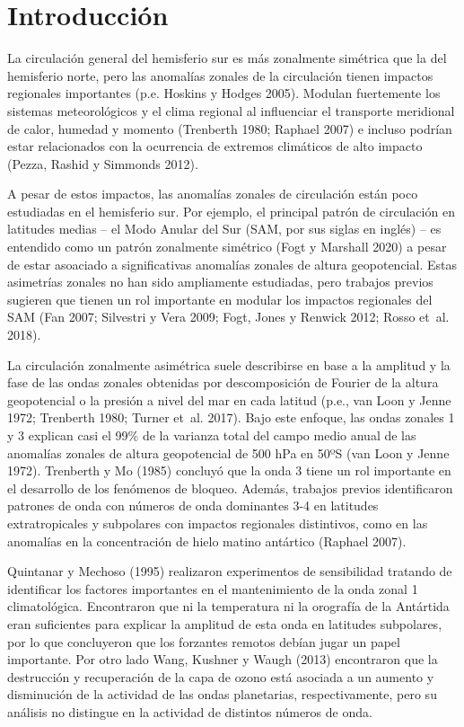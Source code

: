\documentclass[12pt,oneside,a4paper]{reedthesis}
\begin{document}
\hypertarget{intro}{%
\chapter{Introducción}\label{intro}}

La circulación general del hemisferio sur es más zonalmente simétrica que la del hemisferio norte, pero las anomalías zonales de la circulación tienen impactos regionales importantes (p.e. Hoskins y Hodges 2005).
Modulan fuertemente los sistemas meteorológicos y el clima regional al influenciar el transporte meridional de calor, humedad y momento (Trenberth 1980; Raphael 2007) e incluso podrían estar relacionados con la ocurrencia de extremos climáticos de alto impacto (Pezza, Rashid y Simmonds 2012).

A pesar de estos impactos, las anomalías zonales de circulación están poco estudiadas en el hemisferio sur.
Por ejemplo, el principal patrón de circulación en latitudes medias -- el Modo Anular del Sur (SAM, por sus siglas en inglés) -- es entendido como un patrón zonalmente simétrico (Fogt y Marshall 2020) a pesar de estar asoaciado a significativas anomalías zonales de altura geopotencial.
Estas asimetrías zonales no han sido ampliamente estudiadas, pero trabajos previos sugieren que tienen un rol importante en modular los impactos regionales del SAM (Fan 2007; Silvestri y Vera 2009; Fogt, Jones y Renwick 2012; Rosso et~al. 2018).

La circulación zonalmente asimétrica suele describirse en base a la amplitud y la fase de las ondas zonales obtenidas por descomposición de Fourier de la altura geopotencial o la presión a nivel del mar en cada latitud (p.e., van Loon y Jenne 1972; Trenberth 1980; Turner et~al. 2017).
Bajo este enfoque, las ondas zonales 1 y 3 explican casi el 99\% de la varianza total del campo medio anual de las anomalías zonales de altura geopotencial de 500 hPa en 50ºS (van Loon y Jenne 1972).
Trenberth y Mo (1985) concluyó que la onda 3 tiene un rol importante en el desarrollo de los fenómenos de bloqueo.
Además, trabajos previos identificaron patrones de onda con números de onda dominantes 3-4 en latitudes extratropicales y subpolares con impactos regionales distintivos, como en las anomalías en la concentración de hielo matino antártico (Raphael 2007).

Quintanar y Mechoso (1995) realizaron experimentos de sensibilidad tratando de identificar los factores importantes en el mantenimiento de la onda zonal 1 climatológica.
Encontraron que ni la temperatura ni la orografía de la Antártida eran suficientes para explicar la amplitud de esta onda en latitudes subpolares, por lo que concluyeron que los forzantes remotos debían jugar un papel importante.
Por otro lado Wang, Kushner y Waugh (2013) encontraron que la destrucción y recuperación de la capa de ozono está asociada a un aumento y disminución de la actividad de las ondas planetarias, respectivamente, pero su análisis no distingue en la actividad de distintos números de onda.
\end{document}
